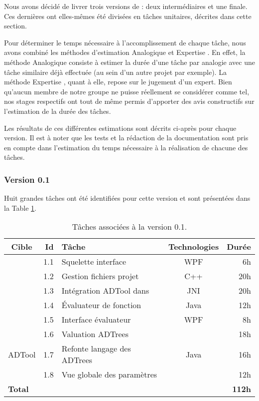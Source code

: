 	Nous avons décidé de livrer trois versions de \glasir{} : deux intermédiaires et une finale. Ces dernières ont elles-mêmes été divisées en tâches unitaires, décrites dans cette section.
	
	Pour déterminer le temps nécessaire à l'accomplissement de chaque tâche, nous avons combiné les méthodes d’estimation \og Analogique \fg{} et \og Expertise \fg{}. En effet, la méthode \og Analogique \fg{} consiste à estimer la durée d'une tâche par analogie avec une tâche similaire déjà effectuée (au sein d'un autre projet par exemple). La méthode \og Expertise \fg{}, quant à elle, repose sur le jugement d'un expert. Bien qu'aucun membre de notre groupe ne puisse réellement se considérer comme tel, nos stages respectifs ont tout de même permis d'apporter des avis constructifs sur l'estimation de la durée des tâches.
	
	Les résultats de ces différentes estimations sont décrits ci-après pour chaque version. Il est à noter que les tests et la rédaction de la documentation sont pris en compte dans l'estimation du temps nécessaire à la réalisation de chacune des tâches.
	

		\subsubsection{Version 0.1}
			Huit grandes tâches ont été identifiées pour cette version et sont présentées dans la {\sc Table} \ref{tab:taches_units_1}. 
			\begin{table}[H]
				\centering
				\begin{tabular}{|c|r|l|c|r|}
					\hline
					\textbf{Cible} & \textbf{Id} & \textbf{Tâche} & \textbf{Technologies} & \textbf{Durée}\\
					\hline

					\multirow{5}{*}{\glasir{}} & 1.1 & Squelette interface & WPF & 6h\\
					\cline{2-5}
					 & 1.2 & Gestion fichiers projet & C++ & 20h\\
					\cline{2-5}
					 & 1.3 & Intégration ADTool dans \glasir & JNI & 20h\\
					\cline{2-5}
					 & 1.4 & \'Evaluateur de fonction & Java & 12h\\
					\cline{2-5}
					 & 1.5 & Interface évaluateur & WPF & 8h\\
					\hline

					\multirow{3}{*}{ADTool} & 1.6 & Valuation ADTrees & \multirow{3}{*}{Java} & 18h\\
					\cline{2-3} \cline{5-5}
					 & 1.7 & Refonte langage des ADTrees & & 16h\\
					\cline{2-3} \cline{5-5}
					 & 1.8 & Vue globale des paramètres & & 12h\\
					\hline

					\multicolumn{4}{|l|}{\bf Total} & {\bf 112h}\\
					\hline
				\end{tabular}
				\caption{Tâches associées à la version 0.1.}
				\label{tab:taches_units_1}
			\end{table}
			
